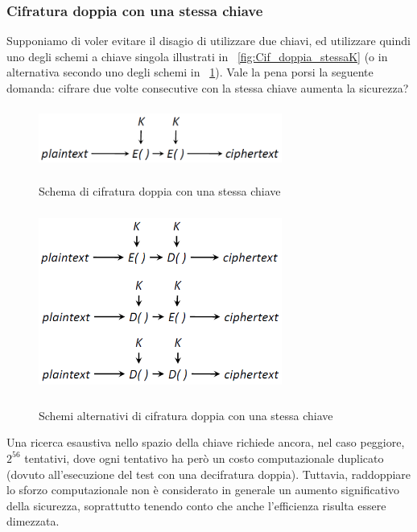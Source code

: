 \subsubsection{Cifratura doppia con una stessa chiave}
Supponiamo di voler evitare il disagio di utilizzare due chiavi, ed utilizzare quindi uno degli schemi a chiave singola illustrati in \figurename ~\ref{fig:Cif_doppia_stessaK} (o in alternativa secondo uno degli schemi in \figurename ~\ref{fig:Cif_doppia_stessaK_alternative}). Vale la pena porsi la seguente domanda: cifrare due volte consecutive con la stessa chiave aumenta la sicurezza?
\begin{figure}[htbp]
	\centering%
	\subfigure%
	{\includegraphics[height=2cm, width=8cm, keepaspectratio]{Immagini/modalita_operative/Cif_doppia_stessaK.png}}
	\caption{Schema di cifratura doppia con una stessa chiave \label{fig:Cif_doppia_stessaK}} 
	\subfigure%
	{\includegraphics[height=6cm, width=8cm, keepaspectratio]{Immagini/modalita_operative/Cif_doppia_stessaK_alternative.png}}
	\caption{Schemi alternativi di cifratura doppia con una stessa chiave \label{fig:Cif_doppia_stessaK_alternative}} 
\end{figure}
Una ricerca esaustiva nello spazio della chiave richiede ancora, nel caso peggiore, $2^{56}$ tentativi, dove ogni  tentativo ha però un costo computazionale duplicato (dovuto all'esecuzione del test con una decifratura doppia). Tuttavia, raddoppiare lo sforzo computazionale non è considerato in generale un aumento significativo della sicurezza, soprattutto tenendo conto che anche l'efficienza risulta essere dimezzata.
